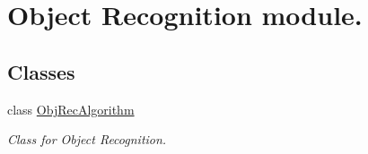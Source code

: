 \hypertarget{group___object_recognition}{\section{Object Recognition module.}
\label{group___object_recognition}
}
\subsection*{Classes}
\begin{DoxyCompactItemize}
\item 
class \hyperlink{class_obj_rec_algorithm}{Obj\-Rec\-Algorithm}
\begin{DoxyCompactList}\small\item\em Class for Object Recognition. \end{DoxyCompactList}\end{DoxyCompactItemize}
